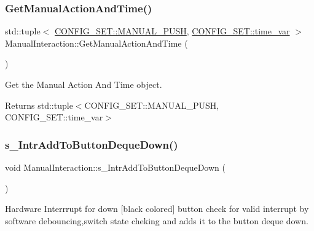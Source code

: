 \subsubsection{\texorpdfstring{Get\+Manual\+Action\+And\+Time()}{GetManualActionAndTime()}}
{\footnotesize\ttfamily std\+::tuple$<$ \hyperlink{namespaceCONFIG__SET_a627706be626fd4e58c539ed120c27748}{C\+O\+N\+F\+I\+G\+\_\+\+S\+E\+T\+::\+M\+A\+N\+U\+A\+L\+\_\+\+P\+U\+SH}, \hyperlink{namespaceCONFIG__SET_a8816a22e7885d027a52bfa0d24fa9008}{C\+O\+N\+F\+I\+G\+\_\+\+S\+E\+T\+::time\+\_\+var} $>$ Manual\+Interaction\+::\+Get\+Manual\+Action\+And\+Time (\begin{DoxyParamCaption}{ }\end{DoxyParamCaption})}



Get the Manual Action And Time object. 

\begin{DoxyReturn}{Returns}
std\+::tuple$<$\+C\+O\+N\+F\+I\+G\+\_\+\+S\+E\+T\+::\+M\+A\+N\+U\+A\+L\+\_\+\+P\+U\+S\+H, C\+O\+N\+F\+I\+G\+\_\+\+S\+E\+T\+::time\+\_\+var$>$ 
\end{DoxyReturn}
\mbox{\label{classManualInteraction_a9a6c72bc26699b16fc328bcacde931fb}} 
\subsubsection{\texorpdfstring{s\+\_\+\+Intr\+Add\+To\+Button\+Deque\+Down()}{s\_IntrAddToButtonDequeDown()}}
{\footnotesize\ttfamily void Manual\+Interaction\+::s\+\_\+\+Intr\+Add\+To\+Button\+Deque\+Down (\begin{DoxyParamCaption}{ }\end{DoxyParamCaption})\hspace{0.3cm}{\ttfamily [static]}}



Hardware Interrrupt for down \mbox{[}black colored\mbox{]} button check for valid interrupt by software debouncing,switch state cheking and adds it to the button deque down. 

